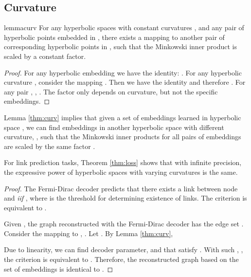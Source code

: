 \documentclass{article}
\newcommand{\cut}[1]{}
\begin{document}
\subsection{Curvature}\label{appendix:curvature}


\begin{restatable}[]{lemma}{curv}
\label{thm:curv}
For any hyperbolic spaces with constant curvatures , and any pair of hyperbolic points   embedded in , there exists a mapping  to another pair of corresponding hyperbolic points in ,  such that the Minkowski inner product is scaled by a constant factor.
\end{restatable}
\begin{proof}
For any hyperbolic embedding  we have the identity:
. 
For any hyperbolic curvature , consider the mapping . Then we have the identity
 and therefore .
For any pair , , . 
The factor  only depends on curvature, but not the specific  embeddings.
\end{proof}

Lemma \ref{thm:curv} implies that given a set of embeddings learned in hyperbolic space , we can find embeddings in another hyperbolic space with different curvature, , such that the Minkowski inner products for all pairs of embeddings are scaled by the same factor .

For link prediction tasks, Theorem \ref{thm:loss} shows that with infinite precision, the expressive power of hyperbolic spaces with varying curvatures is the same.

\vspace{5pt}
\loss*
\begin{proof}
The Fermi-Dirac decoder predicts that there exists a link between node  and  \emph{iif}
, where  is the threshold for determining existence of links.
The criterion is equivalent to .

Given , the graph  reconstructed with the Fermi-Dirac decoder has the edge set .
Consider the mapping to , .
Let .
By Lemma \ref{thm:curv}, 

Due to linearity, we can find decoder parameter,  and  that satisfy 
.
With such , , the criterion 
is equivalent to .
Therefore, the reconstructed graph  based on the set of embeddings  is identical to .
\end{proof}

\cut{
\subsection{Lorentzian Centroid Appoximation}
Aggregation via the Lorentzian Centroid Approximation can be defined as
}
\end{document}
